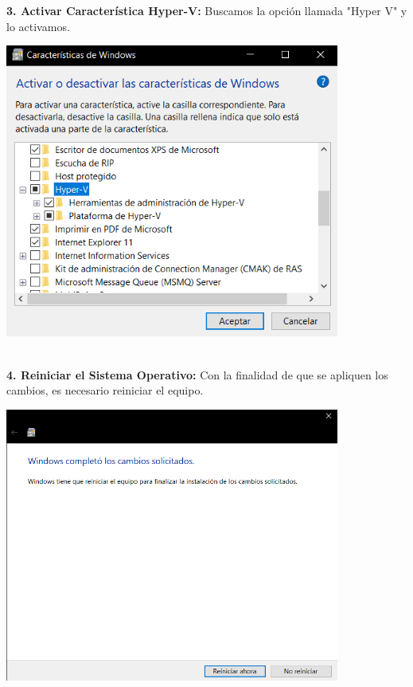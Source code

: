 \begin{enumerate}
\textbf {3. Activar Característica Hyper-V:} Buscamos la opción llamada "Hyper V" y lo activamos.\\
\begin{center}
  \includegraphics[width=11cm]{Imagenes/Activar_Hyper_V.png}
\end{center}
\vspace{12pt}\\

\textbf {4. Reiniciar el Sistema Operativo:} Con la finalidad de que se apliquen los cambios, es necesario reiniciar el equipo.
\begin{center}
  \includegraphics[width=11cm]{Imagenes/Reiniciar.png}
\end{center}
\break


\end{enumerate}
